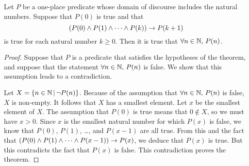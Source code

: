 \begin{theorem}
Let $P$ be a one-place predicate whose domain of discourse includes
the natural numbers.  Suppose that $P(0)$ is true and that
\[(P(0)\wedge P(1)\wedge\cdots\wedge P(k))\rightarrow P(k+1)\]
is true for each natural number $k\geq 0$.  
Then it is true that $\forall n\in{\mathbb N},\,P(n)$.
\end{theorem}
\begin{proof}
Suppose that $P$ is a predicate that satisfies the hypotheses of the
theorem, and suppose that the statement $\forall n\in{\mathbb N},\,P(n)$ is false.
We show that this assumption leads to a contradiction.

Let $X=\{n\in{\mathbb N}\,|\, \lnot P(n)\}$.  Because of the assumption that
$\forall n\in{\mathbb N},\,P(n)$ is false, $X$ is non-empty.  It follows
that $X$ has a smallest element.  Let $x$ be the smallest element of
$X$.  The assumption that $P(0)$ is true means that $0\not\in X$,
so we must have $x>0$.
Since $x$ is the smallest natural number for which $P(x)$ is false,
we know that $P(0)$, $P(1)$, \dots, and $P(x-1)$ are all true.
From this and the fact that $(P(0)\wedge P(1)\wedge\cdots\wedge P(x-1))\rightarrow P(x)$,
we deduce that $P(x)$ is true.  But this contradicts
the fact that $P(x)$ is false.  This contradiction proves the theorem.
\end{proof}




